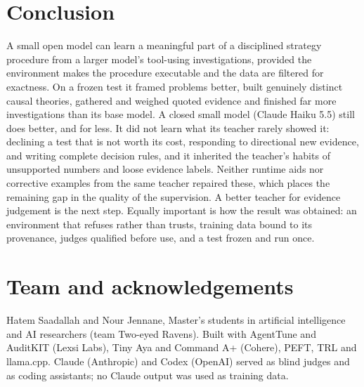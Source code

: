 \section{Conclusion}\label{sec:conclusion}
A small open model can learn a meaningful part of a disciplined strategy procedure from a larger model's tool-using
investigations, provided the environment makes the procedure executable and the data are filtered for exactness. On a
frozen test it framed problems better, built genuinely distinct causal theories, gathered and weighed quoted evidence and
finished far more investigations than its base model. A closed small model (Claude Haiku 5.5) still does better, and for less. It did not learn what
its teacher rarely showed it: declining a test that is not worth its cost, responding to directional new evidence, and
writing complete decision rules, and it inherited the teacher's habits of unsupported numbers and loose evidence
labels. Neither runtime aids nor corrective examples from the same teacher repaired these, which places the remaining
gap in the quality of the supervision. A better teacher for evidence judgement is the next step. Equally important is how the result was obtained: an environment that refuses rather than trusts,
training data bound to its provenance, judges qualified before use, and a test frozen and run once.

\section*{Team and acknowledgements}
Hatem Saadallah and Nour Jennane, Master's students in artificial intelligence and AI researchers (team Two-eyed
Ravens). Built with AgentTune and AuditKIT (Lexsi Labs), Tiny Aya and Command A+ (Cohere), PEFT, TRL and llama.cpp.
Claude (Anthropic) and Codex (OpenAI) served as blind judges and as coding assistants; no Claude output was used as
training data.

